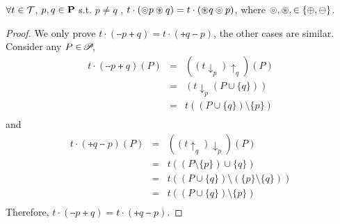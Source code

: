 {{{\begin{lemma}\label{lem:traceorder}
$\forall t\in\mathcal{T}$, $p,q\in\mathbf{P}$ s.t. $ p\neq q$ , $t \cdot (\circledcirc p \circledast q) =  t \cdot (\circledast q  \circledcirc p) $, where $\circledcirc ,\circledast , \in\{\oplus ,\ominus \}$.
\end{lemma}
\begin{proof}
We only prove $t\cdot(\tminus{p} \tplus{ q})=t\cdot (\tplus{ q} \tminus{ p})$, the other cases are similar.
Consider any $P\in\!\mathscr{P}\!$,
\begin{equation*}
\begin{array}{lcl}
	 t\cdot(\tminus{p} \tplus{ q})(P)
	 &=&((t\downarrow_{p})\uparrow_{q})(P)\\
	 &=&(t\downarrow_{p}(P\cup\{q\}))\\
	 &=&t((P\cup\{q\})\setminus\{p\})\\
\end{array}
\end{equation*}
and
\begin{equation*}
\begin{array}{lcl}
t\cdot(\tplus{ q} \tminus{ p})(P)
	&=&((t\uparrow_{q})\downarrow_{p})(P)\\
	&=&t((P\setminus\{p\})\cup \{q\})\\
	&=&t((P\cup\{q\})\setminus(\{p\}\setminus\{q\}))\\
	&=&t((P\cup\{q\})\setminus\{p\})\\
\end{array}
\end{equation*}
Therefore, $t\cdot(\tminus{ p} \tplus{ q})=t\cdot(\tplus{ q} \tminus{ p})$.
\end{proof}

}}}
